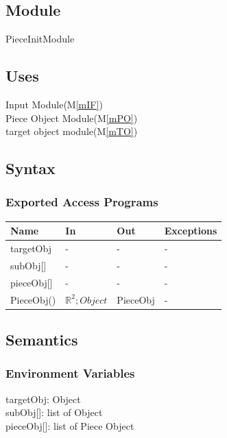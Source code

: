 \documentclass[12pt, titlepage]{article}
\newcommand{\mref}[1]{M\ref{#1}}
\begin{document}
\subsection{Module}

PieceInitModule

\subsection{Uses}

Input Module(\mref{mIF})\\
Piece Object Module(\mref{mPO})\\
target object module(\mref{mTO})\\

\subsection{Syntax}

\subsubsection{Exported Access Programs}

\begin{center}
	\begin{tabular}{p{2cm} p{4cm} p{4cm} p{2cm}}
		\hline
		\textbf{Name} & \textbf{In} & \textbf{Out} & \textbf{Exceptions} \\
		\hline
		targetObj & - & - & -\\
		subObj[] & - & - & -\\
		pieceObj[] & - & - & -\\
		PieceObj() & $\mathbb{R}^{2};Object$ & PieceObj & -\\
		\hline		
	\end{tabular}
\end{center}

\subsection{Semantics}

\subsubsection{Environment Variables}

targetObj: Object\\
subObj[]: list of Object\\
pieceObj[]: list of Piece Object\\
\end{document}

